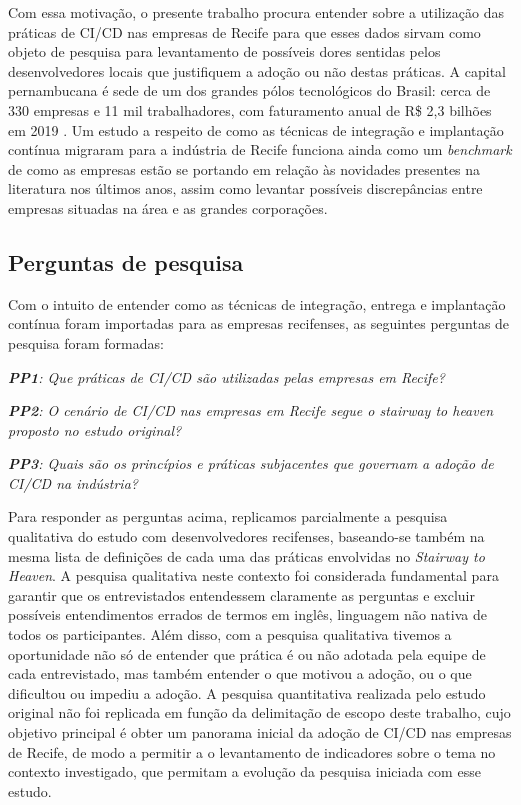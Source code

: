 Com essa motivação, o presente trabalho procura entender sobre a utilização das práticas de CI/CD nas empresas de Recife para que esses dados sirvam como objeto de pesquisa para levantamento de possíveis dores sentidas pelos desenvolvedores locais que justifiquem a adoção ou não destas práticas. A capital pernambucana é sede de um dos grandes pólos tecnológicos do Brasil:  cerca de 330 empresas e 11 mil trabalhadores, com faturamento anual de R\$ 2,3 bilhões em 2019 \cite{portoDigital}. Um estudo a respeito de como as técnicas de integração e implantação contínua migraram para a indústria de Recife funciona ainda como um \emph{benchmark} de como as empresas estão se portando em relação às novidades presentes na literatura nos últimos anos, assim como levantar possíveis discrepâncias entre empresas situadas na área e as grandes corporações. 

\subsection{Perguntas de pesquisa} 
Com o intuito de entender como as técnicas de integração, entrega e implantação contínua foram importadas para as empresas recifenses, as seguintes perguntas de pesquisa foram formadas:

\vspace{2mm}

\textit{\textbf{PP1}:  Que práticas de CI/CD são utilizadas pelas empresas em Recife?}

\vspace{1mm}

\textit{\textbf{PP2}: O cenário de CI/CD nas empresas em Recife segue o \emph{stairway to heaven} proposto no estudo original?}

\vspace{1mm}

\textit{\textbf{PP3}: Quais são os princípios e práticas subjacentes que governam a adoção de CI/CD na indústria?}

\vspace{2mm}

Para responder as perguntas acima, replicamos parcialmente a pesquisa qualitativa do estudo \cite{empiricalStudy2016} com desenvolvedores recifenses, baseando-se também na mesma lista de definições de cada uma das práticas envolvidas no \emph{Stairway to Heaven}. A pesquisa qualitativa neste contexto foi considerada fundamental para garantir que os entrevistados entendessem claramente as perguntas e excluir possíveis entendimentos errados de termos em inglês, linguagem não nativa de todos os participantes. Além disso, com a pesquisa qualitativa tivemos a oportunidade não só de entender que prática é ou não adotada pela equipe de cada entrevistado, mas também entender o que motivou a adoção, ou o que dificultou ou impediu a adoção. A pesquisa quantitativa realizada pelo estudo original não foi replicada em função da delimitação de escopo deste trabalho, cujo objetivo principal é obter um panorama inicial da adoção de CI/CD nas empresas de Recife, de modo a permitir a o levantamento de indicadores sobre o tema no contexto investigado, que permitam a evolução da pesquisa iniciada com esse estudo.

